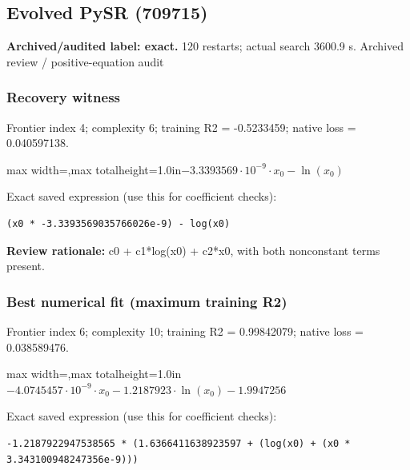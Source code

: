 \documentclass[10pt,letterpaper,landscape]{article}
\begin{document}
\begin{minipage}[t]{0.485\textwidth}
\subsection*{Evolved PySR (709715)}
\textbf{Archived/audited label: exact.} 120 restarts; actual search 3600.9 s.
{\small Archived review / positive-equation audit}
\subsubsection*{Recovery witness}
Frontier index 4; complexity 6; training R2 = -0.5233459; native loss = 0.040597138.
\begin{center}\begin{adjustbox}{max width=\linewidth,max totalheight=1.0in}$\displaystyle - 3.3393569 \cdot 10^{-9} \cdot x_{0} - \ln{\left(x_{0} \right)}$\end{adjustbox}\end{center}
{\scriptsize Exact saved expression (use this for coefficient checks):}
\begin{lstlisting}
(x0 * -3.3393569035766026e-9) - log(x0)
\end{lstlisting}
{\small\textbf{Review rationale:} c0 + c1*log(x0) + c2*x0, with both nonconstant terms present.}
\subsubsection*{Best numerical fit (maximum training R2)}
Frontier index 6; complexity 10; training R2 = 0.99842079; native loss = 0.038589476.
\begin{center}\begin{adjustbox}{max width=\linewidth,max totalheight=1.0in}$\displaystyle - 4.0745457 \cdot 10^{-9} \cdot x_{0} - 1.2187923 \cdot \ln{\left(x_{0} \right)} - 1.9947256$\end{adjustbox}\end{center}
{\scriptsize Exact saved expression (use this for coefficient checks):}
\begin{lstlisting}
-1.2187922947538565 * (1.6366411638923597 + (log(x0) + (x0 * 3.343100948247356e-9)))
\end{lstlisting}
\end{minipage}
\clearpage{}\label{schechter-10004}
\end{document}
